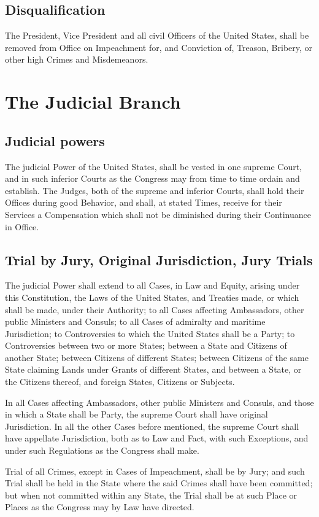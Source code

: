 \documentclass{constitution}
\begin{document}
\section{Disqualification}
The President, Vice President and all civil Officers of the United States, shall be removed from Office on Impeachment for, and Conviction of, Treason, Bribery, or other high Crimes and Misdemeanors.

\chapter{The Judicial Branch}
\section{Judicial powers}
The judicial Power of the United States,
shall be vested in one supreme Court,
and in such inferior Courts as the Congress may from time to time ordain and establish.
The Judges, both of the supreme and inferior Courts, shall hold their Offices during good Behavior,
and shall, at stated Times, receive for their Services a Compensation which shall not be diminished during their Continuance in Office.

\section{Trial by Jury, Original Jurisdiction, Jury Trials}
The judicial Power shall extend
to all Cases, in Law and Equity, arising under this Constitution, the Laws of the United States, and Treaties made, or which shall be made, under their Authority;
to all Cases affecting Ambassadors, other public Ministers and Consuls;
to all Cases of admiralty and maritime Jurisdiction;
to Controversies to which the United States shall be a Party;
to Controversies between two or more States;
between a State and Citizens of another State;
between Citizens of different States;
between Citizens of the same State claiming Lands under Grants of different States, and between a State, or the Citizens thereof, and foreign States, Citizens or Subjects.

In all Cases affecting Ambassadors, other public Ministers and Consuls, and those in which a State shall be Party,
the supreme Court shall have original Jurisdiction.
In all the other Cases before mentioned,
the supreme Court shall have appellate Jurisdiction, both as to Law and Fact,
with such Exceptions, and under such Regulations as the Congress shall make.

Trial of all Crimes, except in Cases of Impeachment, shall be by Jury;
and such Trial shall be held in the State where the said Crimes shall have been committed;
but when not committed within any State, the Trial shall be at such Place or Places as the Congress may by Law have directed.
\end{document}

